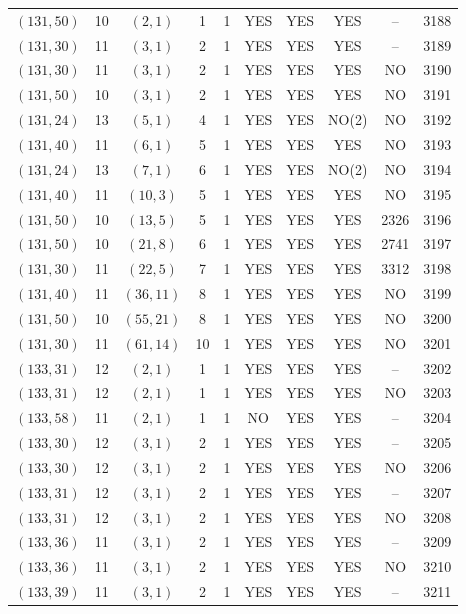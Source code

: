\begin{longtable}{|c|c|c|c|c|c|c|c|c|c|}
$(131, 50)$ & 10 & $(2, 1)$ & 1 & 1 & YES & YES & YES & -- & 3188\\
$(131, 30)$ & 11 & $(3, 1)$ & 2 & 1 & YES & YES & YES & -- & 3189\\
$(131, 30)$ & 11 & $(3, 1)$ & 2 & 1 & YES & YES & YES & NO & 3190\\
$(131, 50)$ & 10 & $(3, 1)$ & 2 & 1 & YES & YES & YES & NO & 3191\\
$(131, 24)$ & 13 & $(5, 1)$ & 4 & 1 & YES & YES & NO(2) & NO & 3192\\
$(131, 40)$ & 11 & $(6, 1)$ & 5 & 1 & YES & YES & YES & NO & 3193\\
$(131, 24)$ & 13 & $(7, 1)$ & 6 & 1 & YES & YES & NO(2) & NO & 3194\\
$(131, 40)$ & 11 & $(10, 3)$ & 5 & 1 & YES & YES & YES & NO & 3195\\
$(131, 50)$ & 10 & $(13, 5)$ & 5 & 1 & YES & YES & YES & 2326 & 3196\\
$(131, 50)$ & 10 & $(21, 8)$ & 6 & 1 & YES & YES & YES & 2741 & 3197\\
$(131, 30)$ & 11 & $(22, 5)$ & 7 & 1 & YES & YES & YES & 3312 & 3198\\
$(131, 40)$ & 11 & $(36, 11)$ & 8 & 1 & YES & YES & YES & NO & 3199\\
$(131, 50)$ & 10 & $(55, 21)$ & 8 & 1 & YES & YES & YES & NO & 3200\\
$(131, 30)$ & 11 & $(61, 14)$ & 10 & 1 & YES & YES & YES & NO & 3201\\
$(133, 31)$ & 12 & $(2, 1)$ & 1 & 1 & YES & YES & YES & -- & 3202\\
$(133, 31)$ & 12 & $(2, 1)$ & 1 & 1 & YES & YES & YES & NO & 3203\\
$(133, 58)$ & 11 & $(2, 1)$ & 1 & 1 & NO & YES & YES & -- & 3204\\
$(133, 30)$ & 12 & $(3, 1)$ & 2 & 1 & YES & YES & YES & -- & 3205\\
$(133, 30)$ & 12 & $(3, 1)$ & 2 & 1 & YES & YES & YES & NO & 3206\\
$(133, 31)$ & 12 & $(3, 1)$ & 2 & 1 & YES & YES & YES & -- & 3207\\
$(133, 31)$ & 12 & $(3, 1)$ & 2 & 1 & YES & YES & YES & NO & 3208\\
$(133, 36)$ & 11 & $(3, 1)$ & 2 & 1 & YES & YES & YES & -- & 3209\\
$(133, 36)$ & 11 & $(3, 1)$ & 2 & 1 & YES & YES & YES & NO & 3210\\
$(133, 39)$ & 11 & $(3, 1)$ & 2 & 1 & YES & YES & YES & -- & 3211\\

\end{longtable}
